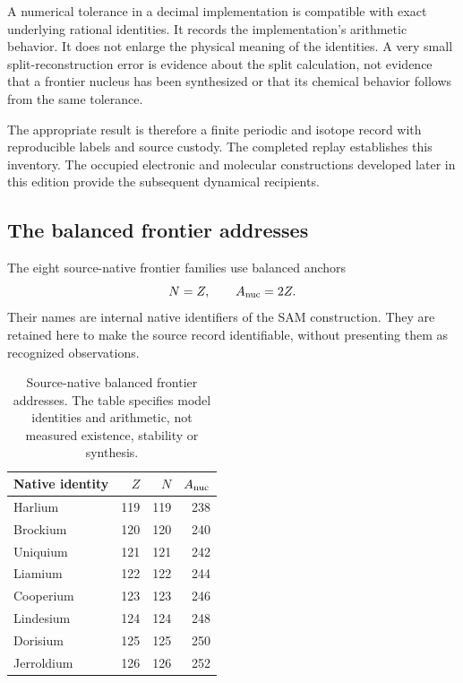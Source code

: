 A numerical tolerance in a decimal implementation is compatible with exact underlying rational identities. It records the implementation's arithmetic behavior. It does not enlarge the physical meaning of the identities. A very small split-reconstruction error is evidence about the split calculation, not evidence that a frontier nucleus has been synthesized or that its chemical behavior follows from the same tolerance.

The appropriate result is therefore a finite periodic and isotope record with reproducible labels and source custody. The completed replay establishes this inventory. The occupied electronic and molecular constructions developed later in this edition provide the subsequent dynamical recipients. 

\subsection{The balanced frontier addresses}

The eight source-native frontier families use balanced anchors
\begin{equation}
N=Z,\qquad A_{\rm nuc}=2Z.
\end{equation}
Their names are internal native identifiers of the SAM construction. They are retained here to make the source record identifiable, without presenting them as recognized observations.

\begin{table}[t]
\centering
\small
\begin{tabular}{lrrr}
\hline
Native identity & $Z$ & $N$ & $A_{\rm nuc}$\\
\hline
Harlium &119&119&238\\
Brockium &120&120&240\\
Uniquium &121&121&242\\
Liamium &122&122&244\\
Cooperium &123&123&246\\
Lindesium &124&124&248\\
Dorisium &125&125&250\\
Jerroldium &126&126&252\\
\hline
\end{tabular}
\caption{Source-native balanced frontier addresses. The table specifies model identities and arithmetic, not measured existence, stability or synthesis.}
\label{tab:vii-frontier}
\end{table}

